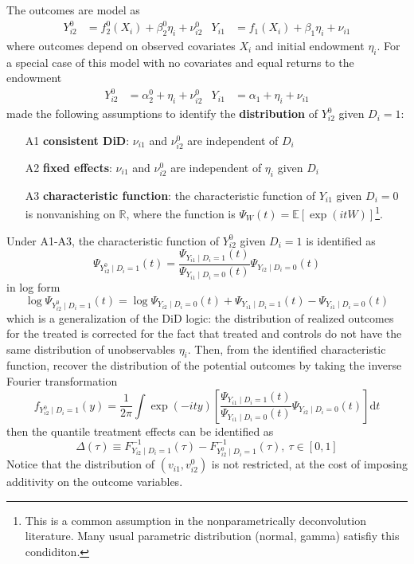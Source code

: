 \documentclass[twoside]{article}
\begin{document}
The outcomes are model as 
\begin{align*}
    Y_{i2}^0 &= f_2^0\left(X_i\right) + \beta_2^0\eta_i + \nu^0_{i2} & Y_{i1} &= f_1\left(X_i\right) + \beta_1\eta_i + \nu_{i1}
\end{align*}
where outcomes depend on observed covariates $X_i$ and initial endowment $\eta_i$. For a special case of this model with no covariates and equal returns to the endowment
\begin{align*}
    Y_{i2}^0 &= \alpha_2^0 + \eta_i + \nu^0_{i2} & Y_{i1} &= \alpha_1 + \eta_i+\nu_{i1}
\end{align*}
\citet{bonhomme2011recover} made the following assumptions to identify the \textbf{distribution} of $Y^0_{i2}$ given $D_i=1$:
\begin{itemize}
    \item[A1] \textbf{consistent DiD}: $\nu_{i1}$ and $\nu_{i2}^0$ are independent of $D_i$
    \item[A2] \textbf{fixed effects}: $\nu_{i1}$ and $\nu_{i2}^0$ are independent of $\eta_i$ given $D_i$
    \item[A3] \textbf{characteristic function}: the characteristic function of $Y_{i1}$ given $D_i=0$ is nonvanishing on $\mathbb{R}$, where the function is $ \Psi_W(t) = \mathbb{E}\left[\exp( it W)\right] $\footnote{This is a common assumption in the nonparametrically deconvolution literature. Many usual parametric distribution (normal, gamma) satisfiy this condiditon.}. 
\end{itemize}
Under A1-A3, the characteristic function of $Y^0_{i2}$ given $D_i=1$ is identified as 
\begin{equation*}
    \Psi _{Y^0_{i2}\mid D_i=1}(t) = \frac{\Psi _{Y_{i1}\mid D_i=1}(t)}{\Psi _{Y_{i1}\mid D_i=0}(t)} \Psi _{Y_{i2}\mid D_i=0}(t)
\end{equation*}
in log form
\begin{equation*}
    \log \Psi _{Y_{i2}^0\mid D_i=1}(t) = \log \Psi _{Y_{i2}\mid D_i=0}(t) + \Psi _{Y_{i1}\mid D_i=1}(t) - \Psi _{Y_{i1}\mid D_i=0}(t)
\end{equation*}
which is a generalization of the DiD logic: the distribution of realized outcomes for the treated is corrected for the fact that treated and controls do not have the same distribution of unobservables $\eta_i$.
Then, from the identified characteristic function, recover the distribution of the potential outcomes by taking the inverse Fourier transformation
\begin{equation*}
    f _{Y_{i2}^0\mid D_i=1}(y) = \frac{1}{2\pi} \int \exp \left(-ity\right) \left[ \frac{\Psi _{Y_{i1}\mid D_i=1}(t)}{\Psi _{Y_{i1}\mid D_i=0}(t)} \Psi _{Y_{i2}\mid D_i=0}(t) \right] \mathrm{d}t
\end{equation*}
then the quantile treatment effects can be identified as 
\begin{equation*}
    \Delta\left(\tau\right) \equiv F^{-1}_{Y_{i2}\mid D_i=1}(\tau) - F^{-1}_{Y^0_{i2}\mid D_i=1}(\tau),\ \tau\in[0,1]
\end{equation*}
Notice that the distribution of $\left(v_{i1},v^0_{i2}\right)$ is not restricted, at the cost of imposing additivity on the outcome variables. 
\end{document}
